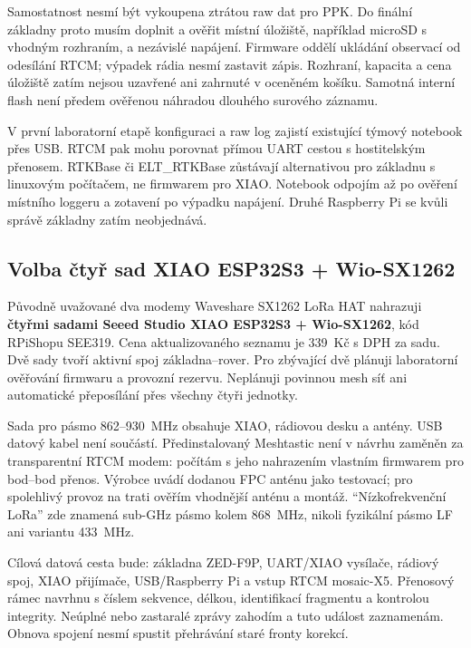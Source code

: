 Samostatnost nesmí být vykoupena ztrátou raw dat pro PPK. Do finální
základny proto musím doplnit a ověřit místní úložiště, například microSD
s vhodným rozhraním, a nezávislé napájení. Firmware oddělí ukládání
observací od odesílání RTCM; výpadek rádia nesmí zastavit zápis.
Rozhraní, kapacita a cena úložiště zatím nejsou uzavřené ani zahrnuté
v oceněném košíku. Samotná interní flash není předem ověřenou náhradou
dlouhého surového záznamu.

V první laboratorní etapě konfiguraci a raw log zajistí existující
týmový notebook přes USB. RTCM pak mohu porovnat přímou UART cestou
s hostitelským přenosem. RTKBase či ELT\_RTKBase zůstávají alternativou
pro základnu s linuxovým počítačem, ne firmwarem pro XIAO.
\cite{rtkbase,elt-rtkbase}
Notebook odpojím až po ověření místního loggeru a zotavení po výpadku
napájení. Druhé Raspberry Pi se kvůli správě základny zatím neobjednává.

\subsection{Volba čtyř sad XIAO ESP32S3 + Wio-SX1262}

Původně uvažované dva modemy Waveshare SX1262 LoRa HAT nahrazuji
\textbf{čtyřmi sadami Seeed Studio XIAO ESP32S3 + Wio-SX1262},
kód RPiShopu SEE319. Cena aktualizovaného seznamu je 339~Kč s DPH za sadu.
\cite{rpishop-xiao-wio}
Dvě sady tvoří aktivní spoj základna--rover. Pro zbývající dvě plánuji
laboratorní ověřování firmwaru a provozní rezervu. Neplánuji povinnou mesh
síť ani automatické přeposílání přes všechny čtyři jednotky.

Sada pro pásmo 862--930~MHz obsahuje XIAO, rádiovou desku a antény.
USB datový kabel není součástí. Předinstalovaný Meshtastic není v návrhu
zaměněn za transparentní RTCM modem: počítám s jeho nahrazením vlastním
firmwarem pro bod--bod přenos. Výrobce uvádí dodanou FPC anténu jako
testovací; pro spolehlivý provoz na trati ověřím vhodnější anténu a montáž.
\cite{seeed-xiao-wio}
\enquote{Nízkofrekvenční LoRa} zde znamená sub-GHz pásmo kolem 868~MHz,
nikoli fyzikální pásmo LF ani variantu 433~MHz.

Cílová datová cesta bude:
základna ZED-F9P, UART/XIAO vysílače, rádiový spoj,
XIAO přijímače, USB/Raspberry Pi a vstup RTCM mosaic-X5.
Přenosový rámec navrhnu s číslem sekvence, délkou, identifikací fragmentu
a kontrolou integrity. Neúplné nebo zastaralé zprávy zahodím a tuto událost
zaznamenám. Obnova spojení nesmí spustit přehrávání staré fronty korekcí.

